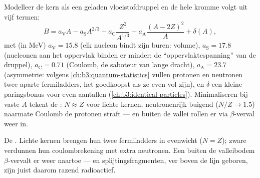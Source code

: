 \begin{proposition}\label{prop:b3:nuclear-physics:semf}
Modelleer de kern als een geladen vloeistofdruppel en de hele kromme
volgt uit vijf termen:
\[
B = a_{\text{V}}A - a_{\text{S}}A^{2/3}
- a_{\text{C}}\frac{Z^2}{A^{1/3}}
- a_{\text{A}}\frac{(A - 2Z)^2}{A} + \delta(A) ,
\]
met (in \unit{MeV}) $a_{\text{V}} = 15.8$ (elk nucleon bindt zijn
buren: volume), $a_{\text{S}} = 17.8$ (nucleonen aan het oppervlak binden
er minder: de ``oppervlaktespanning'' van de druppel), $a_{\text{C}} = 0.71$
(Coulomb, de saboteur van lange dracht), $a_{\text{A}} = 23.7$
(asymmetrie: volgens \cref{ch:b3:quantum-statistics} vullen protonen en
neutronen twee aparte fermiladders, het goedkoopst als ze even
vol zijn), en $\delta$ een kleine paringsbonus voor even aantallen
(\cref{ch:b3:identical-particles}). Minimaliseren bij vaste $A$ tekent
de \emph{}: $N \approx Z$ voor lichte kernen,
neutronenrijk buigend ($N/Z \to 1.5$) naarmate Coulomb de protonen straft
--- en  buiten de vallei rollen er via $\beta$-verval weer in.
\end{proposition}
\admitted

\begin{omfigure}

{\small De . Lichte kernen brengen hun twee
fermiladders in evenwicht ($N = Z$); zware verdunnen hun coulombrekening met
extra neutronen. Een  buiten de valleibodem $\beta$-vervalt er weer
naartoe --- en splijtingsfragmenten, ver boven de lijn geboren, zijn
juist daarom razend radioactief.}
\end{omfigure}

